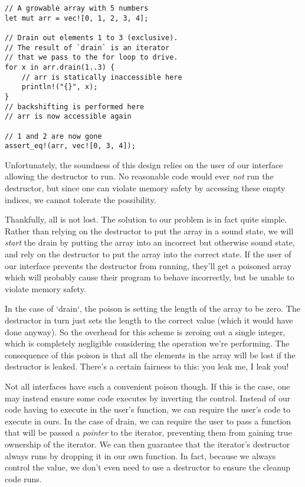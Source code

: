 \begin{verbatim}
// A growable array with 5 numbers
let mut arr = vec![0, 1, 2, 3, 4];

// Drain out elements 1 to 3 (exclusive).
// The result of `drain` is an iterator
// that we pass to the for loop to drive.
for x in arr.drain(1..3) {
    // arr is statically inaccessible here
    println!("{}", x);
}
// backshifting is performed here
// arr is now accessible again

// 1 and 2 are now gone
assert_eq!(arr, vec![0, 3, 4]);
\end{verbatim}

Unfortunately, the soundness of this design relies on the user of our interface
allowing the destructor to run. No reasonable code would ever \emph{not} run the
destructor, but since one can violate memory safety by accessing these empty
indices, we cannot tolerate the possibility.

Thankfully, all is not lost. The solution to our problem is in fact quite simple.
Rather than relying on the destructor to put the array in a sound state,
we will \emph{start} the drain by putting the array into an incorrect but otherwise
sound state, and rely on the destructor to put the array into the correct state.
If the user of our interface prevents the destructor from running,
they'll get a poisoned array which will probably cause their program to behave
incorrectly, but be unable to violate memory safety.

In the case of `drain`, the poison is setting the length of the array to be zero.
The destructor in turn just sets the length to the correct value (which it would
have done anyway). So the overhead for this scheme is zeroing out a single
integer, which is completely negligible considering the operation we're performing.
The consequence of this poison is that all the elements in the array will be
lost if the destructor is leaked. There's a certain fairness to this: you leak me,
I leak you!

Not all interfaces have such a convenient poison though. If this is the case, one
may instead ensure some code executes by inverting the control. Instead of our
code having to execute in the user's function, we can require the user's code
to execute in ours. In the case of drain, we can require the user to pass a
function that will be passed a \emph{pointer} to the iterator, preventing them from
gaining true ownership of the iterator. We can then guarantee that the iterator's
destructor always runs by dropping it in our own function. In fact, because we
always control the value, we don't even need to use a destructor to ensure the
cleanup code runs.

